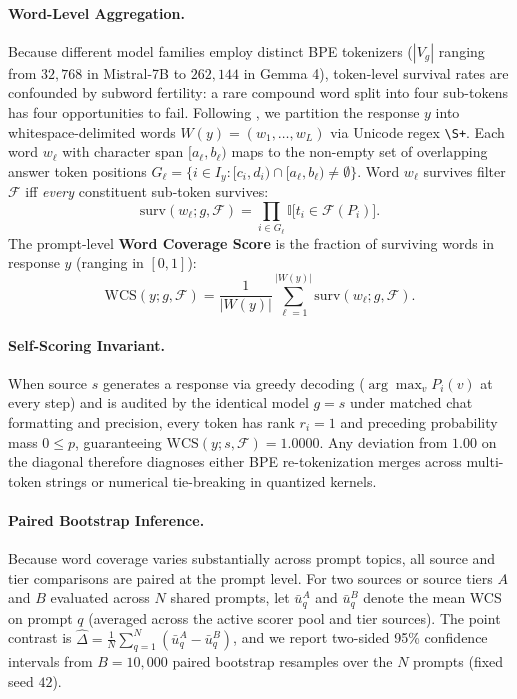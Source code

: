 \documentclass[11pt]{article}
\begin{document}
\paragraph{Word-Level Aggregation.}
Because different model families employ distinct BPE tokenizers ($|V_g|$ ranging from $32{,}768$ in Mistral-7B to $262{,}144$ in Gemma 4), token-level survival rates are confounded by subword fertility: a rare compound word split into four sub-tokens has four opportunities to fail. Following \citet{wcs2026}, we partition the response $y$ into whitespace-delimited words $W(y) = (w_1, \dots, w_L)$ via Unicode regex \texttt{\textbackslash S+}. Each word $w_\ell$ with character span $[a_\ell, b_\ell)$ maps to the non-empty set of overlapping answer token positions $G_\ell = \{i \in I_y : [c_i, d_i) \cap [a_\ell, b_\ell) \neq \emptyset\}$. Word $w_\ell$ survives filter $\mathcal{F}$ iff \emph{every} constituent sub-token survives:
\begin{equation}
    \text{surv}(w_\ell; g, \mathcal{F}) = \prod_{i \in G_\ell} \mathbb{I}\big[t_i \in \mathcal{F}(P_i)\big].
\end{equation}
The prompt-level \textbf{Word Coverage Score} is the fraction of surviving words in response $y$ (ranging in $[0, 1]$):
\begin{equation}
    \text{WCS}(y; g, \mathcal{F}) = \frac{1}{|W(y)|} \sum_{\ell=1}^{|W(y)|} \text{surv}(w_\ell; g, \mathcal{F}).
\end{equation}

\paragraph{Self-Scoring Invariant.}
When source $s$ generates a response via greedy decoding ($\arg\max_v P_i(v)$ at every step) and is audited by the identical model $g=s$ under matched chat formatting and precision, every token has rank $r_i = 1$ and preceding probability mass $0 \le p$, guaranteeing $\text{WCS}(y; s, \mathcal{F}) = 1.0000$. Any deviation from $1.00$ on the diagonal therefore diagnoses either BPE re-tokenization merges across multi-token strings or numerical tie-breaking in quantized kernels.

\paragraph{Paired Bootstrap Inference.}
Because word coverage varies substantially across prompt topics, all source and tier comparisons are paired at the prompt level. For two sources or source tiers $A$ and $B$ evaluated across $N$ shared prompts, let $\bar{u}_q^A$ and $\bar{u}_q^B$ denote the mean WCS on prompt $q$ (averaged across the active scorer pool and tier sources). The point contrast is $\hat{\Delta} = \frac{1}{N}\sum_{q=1}^N (\bar{u}_q^A - \bar{u}_q^B)$, and we report two-sided 95\% confidence intervals from $B = 10{,}000$ paired bootstrap resamples over the $N$ prompts (fixed seed $42$).
\end{document}
